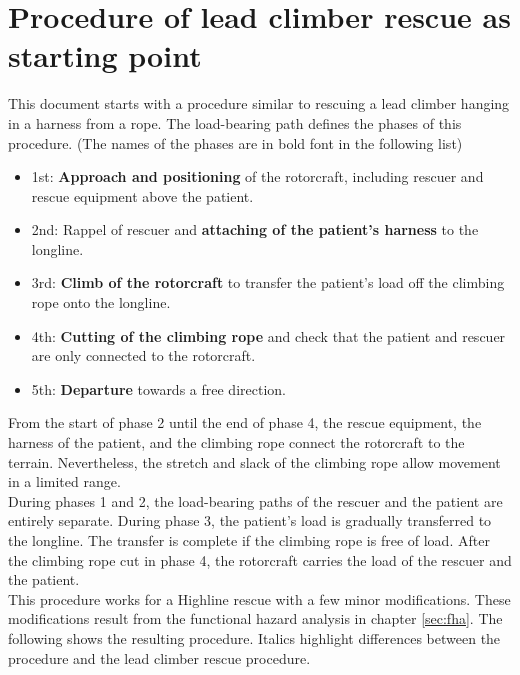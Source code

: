 \documentclass[a4paper,10pt]{scrartcl}
\begin{document}
\section{Procedure of lead climber rescue as starting point}
\label{sec:proc}

This document starts with a procedure similar to rescuing a lead climber hanging in a harness from a rope. The load-bearing path defines the phases of this procedure. (The names of the phases are in bold font in the following list)

\begin{itemize}
\item  1st: \textbf{Approach and positioning} of the rotorcraft, including rescuer and rescue equipment above the patient.
\item  2nd: Rappel of rescuer and \textbf{attaching of the patient's harness} to the longline.
\item 3rd: \textbf{Climb of the rotorcraft} to transfer the patient's load off the climbing rope onto the longline.
\item 4th: \textbf{Cutting of the climbing rope} and check that the patient and rescuer are only connected to the rotorcraft.
\item 5th: \textbf{Departure} towards a free direction.
\end{itemize}

From the start of phase 2 until the end of phase 4, the rescue equipment, the harness of the patient, and the climbing rope connect the rotorcraft to the terrain. Nevertheless, the stretch and slack of the climbing rope allow movement in a limited range. \\

During phases 1 and 2, the load-bearing paths of the rescuer and the patient are entirely separate. During phase 3, the patient's load is gradually transferred to the longline. The transfer is complete if the climbing rope is free of load. After the climbing rope cut in phase 4, the rotorcraft carries the load of the rescuer and the patient. \\

This procedure works for a Highline rescue with a few minor modifications. These modifications result from the functional hazard analysis in chapter \ref{sec:fha}. The following shows the resulting procedure. Italics highlight differences between the procedure and the lead climber rescue procedure. 
\end{document}
